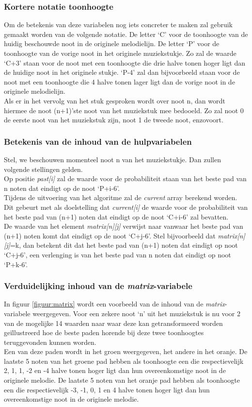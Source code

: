 \subsubsection{Kortere notatie toonhoogte}
Om de betekenis van deze variabelen nog iets concreter te maken zal gebruik gemaakt worden van de volgende notatie. De letter `C' voor de toonhoogte van de huidig beschouwde noot in de originele melodielijn. De letter `P' voor de toonhoogte van de vorige noot in het originele muziekstukje. Zo zal de waarde `C+3' staan voor de noot met een toonhoogte die drie halve tonen hoger ligt dan de huidige noot in het originele stukje. `P-4' zal dan bijvoorbeeld staan voor de noot met een toonhoogte die 4 halve tonen lager ligt dan de vorige noot in de originele melodielijn.\\
Als er in het vervolg van het stuk gesproken wordt over noot n, dan wordt hiermee de noot (n+1)'ste noot van het muziekstuk mee bedooeld. Zo zal noot 0 de eerste noot van het muziekstuk zijn, noot 1 de tweede noot, enzovoort.

\subsubsection{Betekenis van de inhoud van de hulpvariabelen} 
Stel, we beschouwen momenteel noot n van het muziekstukje. Dan zullen volgende stellingen gelden.\\ 
Op positie \textit{past[i]} zal de waarde voor de probabiliteit staan van het beste pad van n noten dat eindigt op de noot `P+i-6'.\\ 
Tijdens de uitvoering van het algoritme zal de \textit{current} array berekend worden. Dit gebeurt met als doelstelling dat \textit{current[i]} de waarde voor de probabiliteit van het beste pad van (n+1) noten dat eindigt op de noot `C+i-6' zal bevatten.\\ 
De waarde van het element \textit{matrix[n][j]} verwijst naar vanwaar het beste pad van (n+1) noten komt dat eindigt op de noot `C+j-6'. Stel bijvoorbeeld dat \textit{matrix[n][j]}=k, dan betekent dit dat het beste pad van (n+1) noten dat eindigt op noot `C+j-6', een verlenging is van het beste pad van n noten dat eindigt op noot `P+k-6'.

\subsubsection{Verduidelijking inhoud van de \textit{matrix}-variabele}
In figuur \ref{figuur:matrix} wordt een voorbeeld van de inhoud van de \textit{matrix}-variabele weergegeven. Voor een zekere noot `n' uit het muziekstuk is nu voor 2 van de mogelijke 14 waarden naar waar deze kan getransformeerd worden ge\"illustreerd hoe de beste paden horende bij deze twee toonhoogtes teruggevonden kunnen worden.\\ 
Een van deze paden wordt in het groen weergegeven, het andere in het oranje. De laatste 5 noten van het groene pad hebben als toonhoogte een die respectievelijk 2, 1, 1, -2 en -4 halve tonen hoger ligt dan hun overeenkomstige noot in de originele melodie. De laatste 5 noten van het oranje pad hebben als toonhoogte een die respectievelijk -3, -1, 0, 1 en 4 halve tonen hoger ligt dan hun overeenkomstige noot in de originele melodie. 

